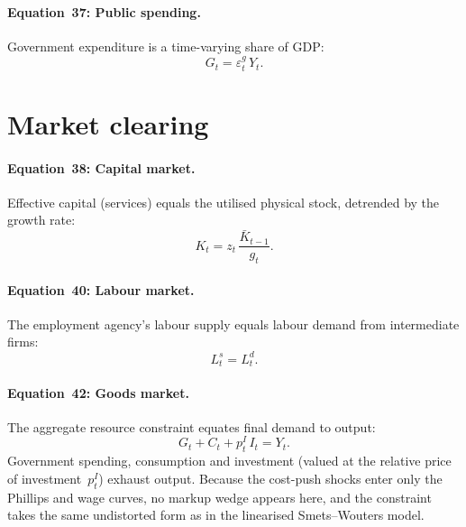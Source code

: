 \documentclass[11pt,a4paper]{article}
\newcommand{\bbar}[1]{\bar{#1}}
\begin{document}
\paragraph{Equation~37: Public spending.}
Government expenditure is a time-varying share of GDP:
\begin{equation}\label{eq:eq37}\tag{Eq.~37}
  \boxed{G_t = \varepsilon^g_t\,Y_t.}
\end{equation}


\section{Market clearing}
\label{sec:clearing}

\paragraph{Equation~38: Capital market.}
Effective capital (services) equals the utilised physical stock, detrended
by the growth rate:
\begin{equation}\label{eq:eq38}\tag{Eq.~38}
  \boxed{K_t = z_t\,\frac{\bbar K_{t-1}}{g_t}.}
\end{equation}

\paragraph{Equation~40: Labour market.}
The employment agency's labour supply equals labour demand from
intermediate firms:
\begin{equation}\label{eq:eq40}\tag{Eq.~40}
  \boxed{L^s_t = L^d_t.}
\end{equation}

\paragraph{Equation~42: Goods market.}
The aggregate resource constraint equates final demand to output:
\begin{equation}\label{eq:eq42}\tag{Eq.~42}
  \boxed{
  G_t + C_t + p^I_t\,I_t = Y_t.}
\end{equation}
Government spending, consumption and investment (valued at the relative
price of investment~$p^I_t$) exhaust output. Because the cost-push
shocks enter only the Phillips and wage curves, no markup wedge appears
here, and the constraint takes the same undistorted form as in the
linearised Smets--Wouters model.
\end{document}

